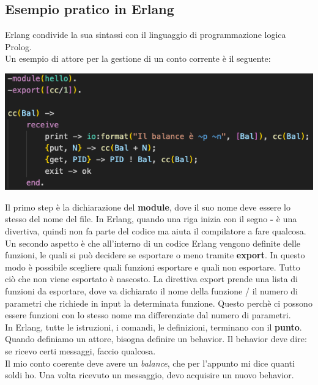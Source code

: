 \documentclass{article}
\begin{document}
\subsection*{Esempio pratico in Erlang}
Erlang condivide la sua sintassi con il linguaggio di programmazione logica Prolog.\\
Un esempio di attore per la gestione di un conto corrente è il seguente:
\begin{center}
    \includegraphics[width=1\textwidth]{img/hello_code.png}
\end{center}
Il primo step è la dichiarazione del \textbf{module}, dove il suo nome deve essere lo stesso del nome del file. In Erlang, quando una riga inizia con il segno \textbf{-} è una divertiva, quindi non fa parte del codice ma aiuta il compilatore a fare qualcosa.\vspace{14pt}\\
Un secondo aspetto è che all'interno di un codice Erlang vengono definite delle funzioni, le quali si può decidere se esportare o meno tramite \textbf{export}. In questo modo è possibile scegliere quali funzioni esportare e quali non esportare. Tutto ciò che non viene esportato è nascosto. La direttiva export prende una lista di funzioni da esportare, dove va dichiarato il nome della funzione / il numero di parametri che richiede in input la determinata funzione. Questo perchè ci possono essere funzioni con lo stesso nome ma differenziate dal numero di parametri.\vspace{14pt}\\
In Erlang, tutte le istruzioni, i comandi, le definizioni, terminano con il \textbf{punto}.\vspace{14pt}\\
Quando definiamo un attore, bisogna definire un behavior. Il behavior deve dire: se ricevo certi messaggi, faccio qualcosa.\\
Il mio conto coerente deve avere un \textit{balance}, che per l'appunto mi dice quanti soldi ho. Una volta ricevuto un messaggio, devo acquisire un nuovo behavior.\\
\end{document}
